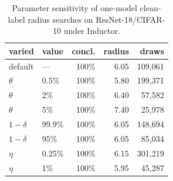 \begin{table}
\centering\scriptsize
\renewcommand{\arraystretch}{0.85}
\vspace{-4mm}
\setlength{\tabcolsep}{3pt}
\caption{Parameter sensitivity of one-model clean-label radius searches on ResNet-18/CIFAR-10 under Inductor.}
\label{tab:param}
\begin{tabular*}{\linewidth}{@{\extracolsep{\fill}}llrrr}
\toprule
varied & value & concl. & radius & draws \\
\midrule
default & --- & 100\% & 6.05 & 109,061 \\
$\theta$ & 0.5\% & 100\% & 5.80 & 199,371 \\
$\theta$ & 2\% & 100\% & 6.40 & 57,582 \\
$\theta$ & 5\% & 100\% & 7.40 & 25,978 \\
$1-\delta$ & 99.9\% & 100\% & 6.05 & 148,694 \\
$1-\delta$ & 95\% & 100\% & 6.05 & 85,034 \\
$\eta$ & 0.25\% & 100\% & 6.15 & 301,219 \\
$\eta$ & 1\% & 100\% & 5.95 & 45,287 \\
\bottomrule
\end{tabular*}
\vspace{-4mm}
\end{table}
